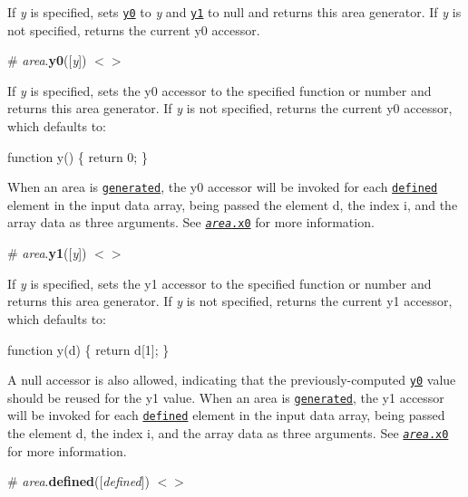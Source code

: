 If {\itshape y} is specified, sets \href{#area_y0}{\tt y0} to {\itshape y} and \href{#area_y1}{\tt y1} to null and returns this area generator. If {\itshape y} is not specified, returns the current y0 accessor.

\label{_area_y0}%
\# {\itshape area}.{\bfseries y0}(\mbox{[}{\itshape y}\mbox{]}) \href{https://github.com/d3/d3-shape/blob/master/src/area.js#L75}{\tt $<$$>$}

If {\itshape y} is specified, sets the y0 accessor to the specified function or number and returns this area generator. If {\itshape y} is not specified, returns the current y0 accessor, which defaults to\+:


\begin{DoxyCode}
function y() \{
  return 0;
\}
\end{DoxyCode}


When an area is \href{#_area}{\tt generated}, the y0 accessor will be invoked for each \href{#area_defined}{\tt defined} element in the input data array, being passed the element {\ttfamily d}, the index {\ttfamily i}, and the array {\ttfamily data} as three arguments. See \href{#area_x0}{\tt {\itshape area}.x0} for more information.

\label{_area_y1}%
\# {\itshape area}.{\bfseries y1}(\mbox{[}{\itshape y}\mbox{]}) \href{https://github.com/d3/d3-shape/blob/master/src/area.js#L79}{\tt $<$$>$}

If {\itshape y} is specified, sets the y1 accessor to the specified function or number and returns this area generator. If {\itshape y} is not specified, returns the current y1 accessor, which defaults to\+:


\begin{DoxyCode}
function y(d) \{
  return d[1];
\}
\end{DoxyCode}


A null accessor is also allowed, indicating that the previously-\/computed \href{#area_y0}{\tt y0} value should be reused for the y1 value. When an area is \href{#_area}{\tt generated}, the y1 accessor will be invoked for each \href{#area_defined}{\tt defined} element in the input data array, being passed the element {\ttfamily d}, the index {\ttfamily i}, and the array {\ttfamily data} as three arguments. See \href{#area_x0}{\tt {\itshape area}.x0} for more information.

\label{_area_defined}%
\# {\itshape area}.{\bfseries defined}(\mbox{[}{\itshape defined}\mbox{]}) \href{https://github.com/d3/d3-shape/blob/master/src/area.js#L96}{\tt $<$$>$}

